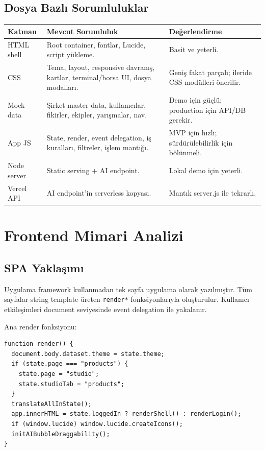 \documentclass[11pt,a4paper]{article}
\newcommand{\code}[1]{\texttt{#1}}
\begin{document}
\subsection{Dosya Bazlı Sorumluluklar}

\begin{longtable}{p{}p{}p{}}
\toprule
\textbf{Katman} & \textbf{Mevcut Sorumluluk} & \textbf{Değerlendirme}\\
\midrule
HTML shell & Root container, fontlar, Lucide, script yükleme. & Basit ve yeterli.\\
CSS & Tema, layout, responsive davranış, kartlar, terminal/borsa UI, dosya modalları. & Geniş fakat parçalı; ileride CSS modülleri önerilir.\\
Mock data & Şirket master data, kullanıcılar, fikirler, ekipler, yarışmalar, nav. & Demo için güçlü; production için API/DB gerekir.\\
App JS & State, render, event delegation, iş kuralları, filtreler, işlem mantığı. & MVP için hızlı; sürdürülebilirlik için bölünmeli.\\
Node server & Static serving + AI endpoint. & Lokal demo için yeterli.\\
Vercel API & AI endpoint'in serverless kopyası. & Mantık server.js ile tekrarlı.\\
\bottomrule
\end{longtable}

\section{Frontend Mimari Analizi}

\subsection{SPA Yaklaşımı}

Uygulama framework kullanmadan tek sayfa uygulama olarak yazılmıştır. Tüm sayfalar string template üreten \code{render*} fonksiyonlarıyla oluşturulur. Kullanıcı etkileşimleri document seviyesinde event delegation ile yakalanır.

Ana render fonksiyonu:

\begin{lstlisting}
function render() {
  document.body.dataset.theme = state.theme;
  if (state.page === "products") {
    state.page = "studio";
    state.studioTab = "products";
  }
  translateAllInState();
  app.innerHTML = state.loggedIn ? renderShell() : renderLogin();
  if (window.lucide) window.lucide.createIcons();
  initAIBubbleDraggability();
}
\end{lstlisting}
\end{document}
